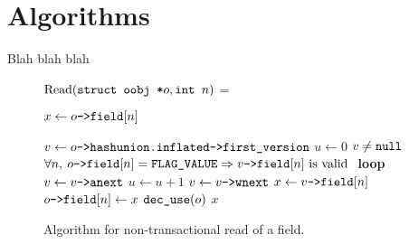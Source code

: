 \documentclass[11pt,notitlepage]{article}
\newcommand{\ptr}{\code{->}}
\begin{document}
\section{Algorithms}

Blah blah blah

\begin{figure}
$\text{Read}(\texttt{struct oobj *} o, \texttt{int } n)$ =
\begin{myalgorithmic}
\STATE $x \gets o\ptr \code{field}[n]$

\STATE $v \gets o \ptr \code{hashunion.inflated} \ptr \code{first\_version}$
\STATE $u \gets 0$ 
\LOOP
  \ASSERT $v \neq \texttt{null}$
    \ASSERT \small$\forall n,\: o \ptr \code{field}[n]=\code{FLAG\_VALUE}
             \Rightarrow  v \ptr \code{field}[n] \text{ is valid }$
    \BREAK \textbf{loop}
   \ENDCASE
    \STATE $v \gets v\ptr\code{anext}$
   \ENDCASE
    \STATE $u \gets u + 1$
    \STATE $v \gets v \ptr \code{wnext}$
   \ENDCASE
  \ENDMATCHING
\ENDLOOP*
\STATE $x \gets v \ptr \code{field}[n]$
  \STATE {}
  \STATE $o \ptr \code{field}[n] \gets x$ 
  \STATE $\texttt{dec\_use}(o)$
\ENDIF
\ENDIF
\RETURN $x$
\end{myalgorithmic}
\caption{Algorithm for non-transactional read of a field.}
\label{fig:readnotrans}
\end{figure}
\end{document}
